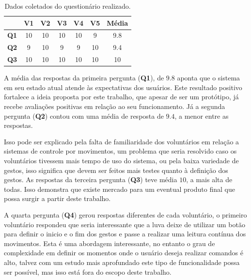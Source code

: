 \begin{table}[ht]
    \centering
    \caption{Dados coletados do questionário realizado.}
    \begin{tabular}{c|c|c|c|c|c||c|}
        \cline{2-7}
         & \textbf{V1} & \textbf{V2} & \textbf{V3} & \textbf{V4} & \textbf{V5} & \textbf{Média} \\ \hline
        \multicolumn{1}{|c|}{\textbf{Q1}} & 10 & 10 & 10 & 10 & 9 & 9.8 \\ \hline
        \multicolumn{1}{|c|}{\textbf{Q2}} & 9 & 10 & 9 & 9 & 10 & 9.4 \\ \hline
        \multicolumn{1}{|c|}{\textbf{Q3}} & 10 & 10 & 10 & 10 & 10 & 10 \\ \hline
    \end{tabular}
    \label{tab:questionario}
\end{table}


A média das respostas da primeira pergunta (\textbf{Q1}), de $9.8$ aponta que o sistema em seu estado atual atende às expectativas dos usuários. Este resultado positivo fortalece a ideia proposta por este trabalho, que apesar de ser um protótipo, já recebe avaliações positivas em relação ao seu funcionamento. Já a segunda pergunta (\textbf{Q2}) contou com uma média de resposta de $9.4$, a menor entre as respostas. 

Isso pode ser explicado pela falta de familiaridade dos voluntários em relação a sistemas de controle por movimentos, um problema que seria resolvido caso os voluntários tivessem mais tempo de uso do sistema, ou pela baixa variedade de gestos, isso significa que devem ser feitos mais testes quanto à definição dos gestos. As respostas da terceira pergunta (\textbf{Q3}) teve  média $10$, a mais alta de todas. Isso demonstra que existe mercado para um eventual produto final que possa surgir a partir deste trabalho.  

A quarta pergunta (\textbf{Q4}) gerou respostas diferentes de cada voluntário, o primeiro voluntário respondeu que seria interessante que a luva deixe de utilizar um botão para definir o inicio e o fim dos gestos e passe a realizar uma leitura contínua dos movimentos. Esta é uma abordagem interessante, no entanto o grau de complexidade em definir os momentos onde o usuário deseja realizar comandos é alto, talvez com um estudo mais aprofundado este tipo de funcionalidade possa ser possível, mas isso está fora do escopo deste trabalho. 

